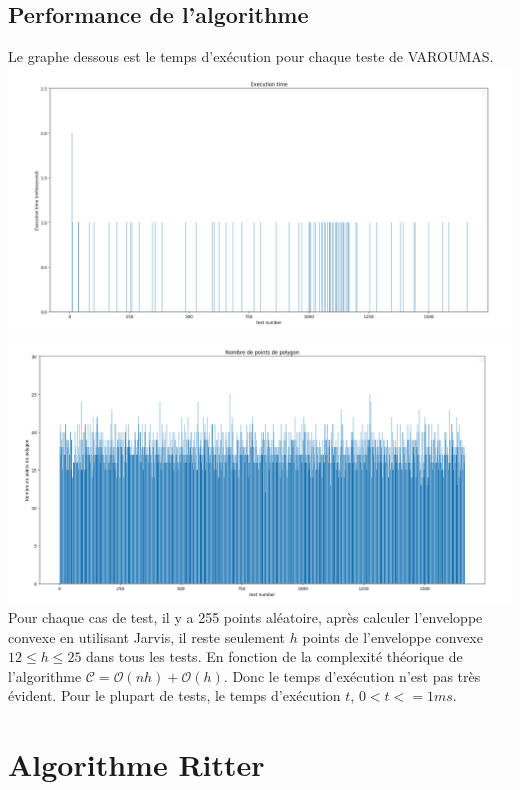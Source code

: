 \documentclass[14px]{article}
\begin{document}
\subsection{Performance de l'algorithme}
Le graphe dessous est le temps d'exécution pour chaque teste de VAROUMAS.\\
\includegraphics[width=\textwidth]{testTime.png}\\
\includegraphics[width=\textwidth]{testNodes.png}\\
Pour chaque cas de test, il y a 255 points aléatoire, après calculer l'enveloppe convexe en utilisant Jarvis, il reste seulement $\mathit{h}$ points de l'enveloppe convexe $ 12 \leqslant h \leqslant 25 $ dans tous les tests. En fonction de la complexité théorique de l'algorithme  $\mathcal{C} = \mathcal{O}(nh) + \mathcal{O}(h)$.
Donc le temps d'exécution n'est pas très évident. Pour le plupart de tests, le temps d'exécution $\mathit{t}$, $ 0 < \mathit{t} <= 1 ms$.
\clearpage


\section{Algorithme Ritter}
\end{document}
